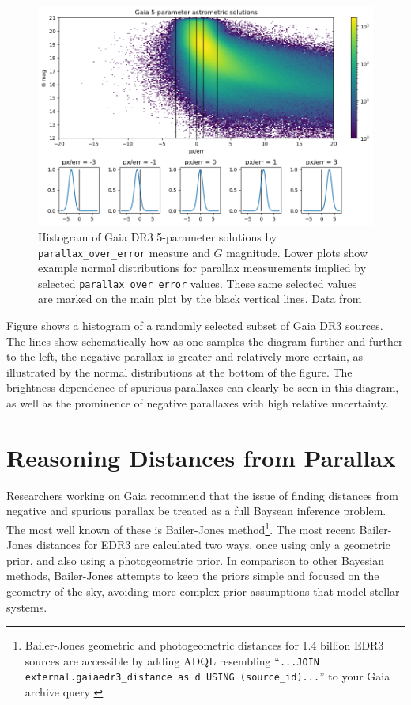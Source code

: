 \documentclass[twocolumn]{aastex631}
\begin{document}
\begin{figure}
	\includegraphics[width=\columnwidth]{poe_map.png}
	\caption{Histogram of Gaia DR3 5-parameter solutions by \texttt{parallax\_over\_error} measure and $G$ magnitude. Lower plots show example normal distributions for parallax measurements implied by selected \texttt{parallax\_over\_error} values. These same selected values are marked on the main plot by the black vertical lines. Data from \cite{collaborationGaia2022}}
	\label{fig:dr3poe}
\end{figure}

Figure \label{fig:dr3poe} shows a histogram of a randomly selected subset of Gaia DR3 sources. The lines show schematically how as one samples the diagram further and further to the left, the negative parallax is greater and relatively more certain, as illustrated by the normal distributions at the bottom of the figure. The brightness dependence of spurious parallaxes can clearly be seen in this diagram, as well as the prominence of negative parallaxes with high relative uncertainty. 


\section{Reasoning Distances from Parallax} \label{sec:distance}

Researchers working on Gaia recommend that the issue of finding distances from negative and spurious parallax be treated as a full Baysean inference problem\citep{luriGaia2018}. The most well known of these is Bailer-Jones method\footnote{Bailer-Jones geometric and photogeometric distances for 1.4 billion EDR3 sources are accessible by adding ADQL resembling ``\texttt{...JOIN external.gaiaedr3\_distance as d USING (source\_id)...}'' to your Gaia archive query \citep{bailer-jonesEstimating2021}}. The most recent Bailer-Jones distances for EDR3 are calculated two ways, once using only a geometric prior, and also using a photogeometric prior. In comparison to other Bayesian methods, Bailer-Jones attempts to keep the priors simple and focused on the geometry of the sky, avoiding more complex prior assumptions that model stellar systems.
\end{document}
